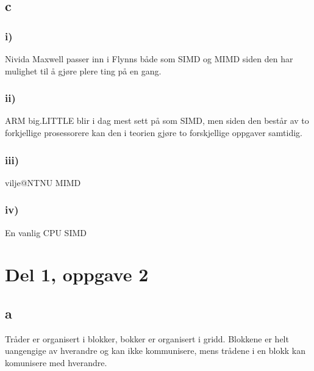\documentclass[12pt, a4paper]{article} %
\begin{document}
\subsection*{c}
\subsubsection*{i)}
Nivida Maxwell passer inn i Flynns både som SIMD og MIMD siden den har mulighet til å gjøre plere ting på en gang.
\subsubsection*{ii)}
ARM big.LITTLE blir i dag mest sett på som SIMD, men siden den består av to forkjellige prosessorere kan den i teorien gjøre to forskjellige oppgaver samtidig.
\subsubsection*{iii)}
vilje@NTNU MIMD
\subsubsection*{iv)}
En vanlig CPU SIMD


\section*{Del 1, oppgave 2}
\subsection*{a}
Tråder er organisert i blokker, bokker er organisert i gridd. Blokkene er helt uangengige av hverandre og kan ikke kommunisere, mens trådene i en blokk kan komunisere med hverandre. 
\end{document}
